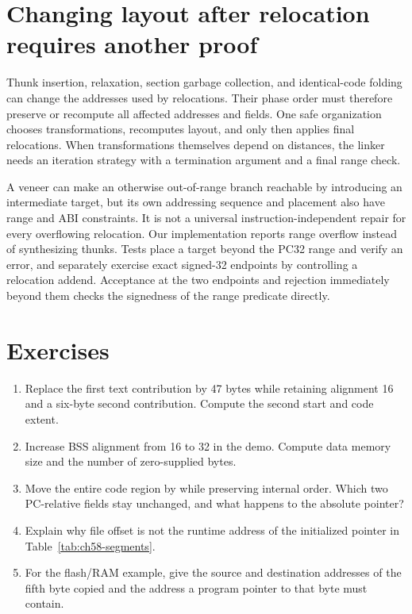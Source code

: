 \section{Changing layout after relocation requires another proof}
\label{sec:ch58-relayout}

Thunk insertion, relaxation, section garbage collection, and identical-code folding can change the addresses used by relocations.
Their phase order must therefore preserve or recompute all affected addresses and fields.
One safe organization chooses transformations, recomputes layout, and only then applies final relocations.
When transformations themselves depend on distances, the linker needs an iteration strategy with a termination argument and a final range check.

A veneer can make an otherwise out-of-range branch reachable by introducing an intermediate target, but its own addressing sequence and placement also have range and ABI constraints.
It is not a universal instruction-independent repair for every overflowing relocation.
Our implementation reports range overflow instead of synthesizing thunks.
Tests place a target beyond the PC32 range and verify an error, and separately exercise exact signed-32 endpoints by controlling a relocation addend.
Acceptance at the two endpoints and rejection immediately beyond them checks the signedness of the range predicate directly.

\section{Exercises}
\label{sec:ch58-exercises}
\begin{enumerate}
\item\label{ex:ch58-layout} Replace the first text contribution by 47 bytes while retaining alignment 16 and a six-byte second contribution. Compute the second start and code extent.
\item\label{ex:ch58-zero} Increase BSS alignment from 16 to 32 in the demo. Compute data memory size and the number of zero-supplied bytes.
\item\label{ex:ch58-rebase} Move the entire code region by  while preserving internal order. Which two PC-relative fields stay unchanged, and what happens to the absolute pointer?
\item\label{ex:ch58-file} Explain why file offset  is not the runtime address of the initialized pointer in Table~\ref{tab:ch58-segments}.
\item\label{ex:ch58-lma} For the flash/RAM example, give the source and destination addresses of the fifth byte copied and the address a program pointer to that byte must contain.
\end{enumerate}

